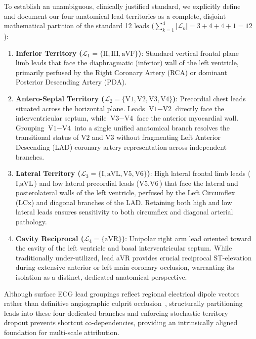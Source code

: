 \documentclass[5p,twocolumn,10pt]{elsarticle}
\begin{document}
To establish an unambiguous, clinically justified standard, we explicitly define and document our four anatomical lead territories as a complete, disjoint mathematical partition of the standard 12 leads ($\sum_{k=1}^4 |\mathcal{L}_k| = 3 + 4 + 4 + 1 = 12$):
\begin{enumerate}
    \item \textbf{Inferior Territory ($\mathcal{L}_1 = \{\text{II}, \text{III}, \text{aVF}\}$)}: Standard vertical frontal plane limb leads that face the diaphragmatic (inferior) wall of the left ventricle, primarily perfused by the Right Coronary Artery (RCA) or dominant Posterior Descending Artery (PDA).
    \item \textbf{Antero-Septal Territory ($\mathcal{L}_2 = \{\text{V1}, \text{V2}, \text{V3}, \text{V4}\}$)}: Precordial chest leads situated across the horizontal plane. Leads $\text{V1}-\text{V2}$ directly face the interventricular septum, while $\text{V3}-\text{V4}$ face the anterior myocardial wall. Grouping $\text{V1}-\text{V4}$ into a single unified anatomical branch resolves the transitional status of $\text{V2}$ and $\text{V3}$ without fragmenting Left Anterior Descending (LAD) coronary artery representation across independent branches.
    \item \textbf{Lateral Territory ($\mathcal{L}_3 = \{\text{I}, \text{aVL}, \text{V5}, \text{V6}\}$)}: High lateral frontal limb leads ($\text{I}, \text{aVL}$) and low lateral precordial leads ($\text{V5}, \text{V6}$) that face the lateral and posterolateral walls of the left ventricle, perfused by the Left Circumflex (LCx) and diagonal branches of the LAD. Retaining both high and low lateral leads ensures sensitivity to both circumflex and diagonal arterial pathology.
    \item \textbf{Cavity Reciprocal ($\mathcal{L}_4 = \{\text{aVR}\}$)}: Unipolar right arm lead oriented toward the cavity of the left ventricle and basal interventricular septum. While traditionally under-utilized, lead $\text{aVR}$ provides crucial reciprocal ST-elevation during extensive anterior or left main coronary occlusion, warranting its isolation as a distinct, dedicated anatomical perspective.
\end{enumerate}
Although surface ECG lead groupings reflect regional electrical dipole vectors rather than definitive angiographic culprit occlusion~\cite{wagner2009aha}, structurally partitioning leads into these four dedicated branches and enforcing stochastic territory dropout prevents shortcut co-dependencies, providing an intrinsically aligned foundation for multi-scale attribution.
\end{document}
